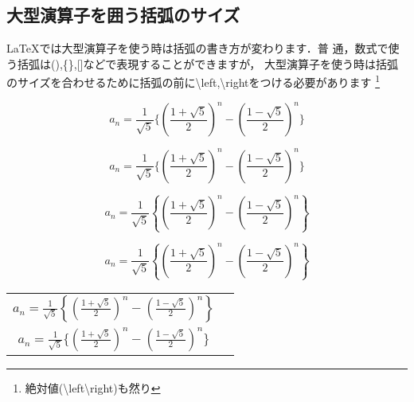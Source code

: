 \documentclass[dvipdfmx,uplatex]{jsarticle}
\begin{document}
{\subsection{大型演算子を囲う括弧のサイズ}
\LaTeX では大型演算子を使う時は括弧の書き方が変わります．普
通，数式で使う括弧は(),\{\},[]などで表現することができますが，
大型演算子を使う時は括弧のサイズを合わせるために括弧の前に\textbackslash left,\textbackslash rightをつける必要があります
\footnote{絶対値(\textbackslash left\textbar \textbackslash right\textbar )も然り}
\begin{tcolorbox}[title=大型演算子を囲う括弧のサイズ]
  \begin{tcolorbox}[title=\textbackslash left \textbackslash rightをつけない, colframe=wrongcolor]
    \begin{excode}
      \begin{equation*}
        a_n = \frac{1}{\sqrt{5}}\{(\frac{1+\sqrt{5}}{2})^n -
        (\frac{1-\sqrt{5}}{2})^n\}
      \end{equation*}
    \end{excode}
    \begin{equation*}
      a_n = \frac{1}{\sqrt{5}}\{(\frac{1+\sqrt{5}}{2})^n - (\frac{1-\sqrt{5}}{2})^n\}
    \end{equation*}
  \end{tcolorbox}
  \begin{tcolorbox}[title=\textbackslash left \textbackslash right をつける, colframe=correctcolor]
    \begin{excode}
      \begin{equation*}
        a_n = \frac{1}{\sqrt{5}}\left\{\left(\frac{1+\sqrt{5}}{2}\right)^n -
        \left(\frac{1-\sqrt{5}}{2}\right)^n\right\}
      \end{equation*}
    \end{excode}
    \begin{equation*}
      a_n = \frac{1}{\sqrt{5}}\left\{\left(\frac{1+\sqrt{5}}{2}\right)^n - \left(\frac{1-\sqrt{5}}{2}\right)^n\right\}
    \end{equation*}
  \end{tcolorbox}
\end{tcolorbox}

\begin{center}{
  \begin{tabular}{cc}
$\displaystyle a_n = \frac{1}{\sqrt{5}}\left\{\left(\frac{1+\sqrt{5}}{2}\right)^n - \left(\frac{1-\sqrt{5}}{2}\right)^n\right\}$ \\[10mm]
$a_n = \frac{1}{\sqrt{5}}\{(\frac{1+\sqrt{5}}{2})^n - (\frac{1-\sqrt{5}}{2})^n\}$
\end{tabular}
}\end{center}
}
\end{document}
